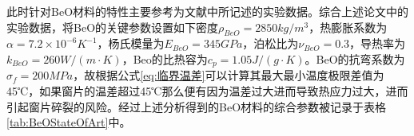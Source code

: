 \documentclass[master]{thesis-uestc}
\begin{document}
此时针对BeO材料的特性主要参考为文献\cite{thumm_stateart_2020, slack_thermal_1971,kozlovskii_thermal_2014}中所记述的实验数据。综合上述论文中的实验数据，将BeO的关键参数设置如下密度\(\rho_{BeO} = 2850kg/m^3\)，热膨胀系数为\(\alpha = 7.2 \times 10^{-6} K^{-1}\)，杨氏模量为\(E_{BeO} = 345GPa\)，泊松比为\(\nu_{BeO} = 0.3\)，导热率为\(k_{BeO} = 260 W/(m \cdot K)\)，Beo的比热容为\(c_p=1.05J/(g \cdot K)\)。BeO的抗弯系数为$\sigma_f = 200MPa$，故根据公式\ref{eq:临界温差}可以计算其最大最小温度极限差值为45℃，如果窗片的温差超过45℃那么便有因为温差过大进而导致热应力过大，进而引起窗片碎裂的风险。经过上述分析得到的BeO材料的综合参数被记录于表格\ref{tab:BeOStateOfArt}中。
\begin{table}[!htb]
    \caption{BeO材料属性}
    \label{tab:BeOStateOfArt}
\end{table}
\end{document}
